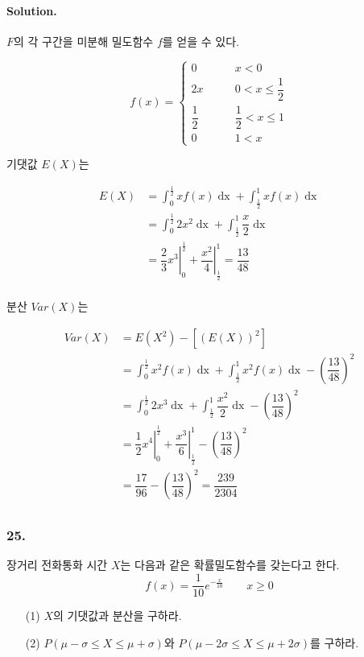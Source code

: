 \paragraph{Solution.} $F$의 각 구간을 미분해 밀도함수 $f$를 얻을 수 있다.

\[f\left(x\right) = \left\{
\begin{array}{ll}
	0 & \qquad x < 0 \\
	2x & \qquad 0 < x \leq \dfrac{1}{2} \\
	\dfrac{1}{2} & \qquad \dfrac{1}{2} < x \leq 1\\
	0 & \qquad 1 < x
\end{array}
\right. \]

기댓값 $E\left(X\right)$는

\begin{align*}
  	E\left(X\right) &= \int_0^\frac{1}{2} xf\left(x\right) \mathop{dx} + \int_\frac{1}{2}^1 xf\left(x\right) \mathop{dx}\\
  	&= \int_0^\frac{1}{2} 2x^2 \mathop{dx} + \int_\frac{1}{2}^1 \dfrac{x}{2} \mathop{dx}\\
  	&= \left.\dfrac{2}{3}x^3\right|_0^\frac{1}{2} + \left.\dfrac{x^2}{4}\right|_\frac{1}{2}^1 = \dfrac{13}{48}\\
 \end{align*}
 
분산 $Var\left(X\right)$는

\begin{align*}
  	Var\left(X\right) &= E\left(X^2\right) - \left[\left(E\left(X\right)\right)^2\right]\\
  	&= \int_0^\frac{1}{2} x^2 f\left(x\right) \mathop{dx} + \int_\frac{1}{2}^1 x^2 f\left(x\right) \mathop{dx} - \left(\dfrac{13}{48}\right)^2\\
  	&= \int_0^\frac{1}{2} 2x^3 \mathop{dx} + \int_\frac{1}{2}^1 \dfrac{x^2}{2} \mathop{dx} - \left(\dfrac{13}{48}\right)^2\\
  	&= \left.\dfrac{1}{2}x^4\right|_0^\frac{1}{2} + \left.\dfrac{x^3}{6}\right|_\frac{1}{2}^1 - \left(\dfrac{13}{48}\right)^2\\
  	&= \dfrac{17}{96} - \left(\dfrac{13}{48}\right)^2 = \dfrac{239}{2304}\\
 \end{align*}

\subsubsection{25.} 장거리 전화통화 시간 $X$는 다음과 같은 확률밀도함수를 갖는다고 한다. \[f\left(x\right) = \dfrac{1}{10}e^{-\frac{x}{10}} \qquad x\geq 0\]
\begin{itemize}
  \item [(1)] $X$의 기댓값과 분산을 구하라.
  \item [(2)] $P\left(\mu-\sigma\leq X\leq \mu+\sigma\right)$와 $P\left(\mu-2\sigma\leq X\leq \mu+2\sigma\right)$를 구하라.
\end{itemize}

